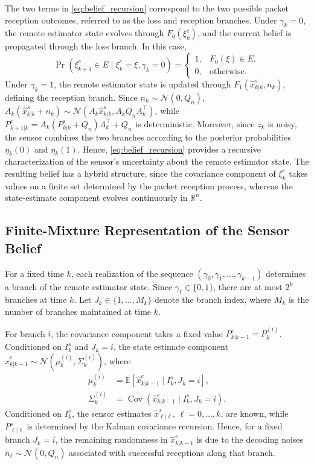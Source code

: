\documentclass[letterpaper, 10 pt, conference]{ieeeconf}
\begin{document}
The two terms in \eqref{eq:belief_recursion} correspond to the two possible packet reception outcomes, referred to as the loss and reception branches.  Under $\gamma_k=0$, the remote estimator state evolves through $F_0(\xi_k^e)$, and the current belief is propagated through the loss branch. In this case, 
\begin{equation*}
    \operatorname{Pr}(\xi^e_{k+1}\in E\mid \xi_k^e=\xi,\gamma_k=0) = \begin{cases}
        1, &  F_0(\xi)\in E,\\[3pt]
        0, & \text{otherwise}.
    \end{cases}
\end{equation*}
Under $\gamma_k=1$, the remote estimator state is updated through $F_1(\hat{x}^s_{k|k},n_k)$, defining the reception branch. 
Since $n_k\sim \mathcal{N}(0,Q_n)$,  $A_k(\hat{x}^s_{k|k}+n_k)\sim \mathcal{N}(A_k\hat{x}^s_{k|k}, A_kQ_nA_k^\top)$, while $P_{k+1|k}^e=A_k(P_{k|k}^s+Q_n)A_k^\top +Q_w$ is deterministic. 
Moreover, since $z_k$ is noisy, the sensor combines the two branches according to the posterior probabilities $\eta_k(0)$ and $\eta_k(1)$. Hence, \eqref{eq:belief_recursion} provides a recursive characterization of the sensor's uncertainty about the remote estimator state. The resulting belief has a hybrid structure, since the covariance component of $\xi_k^e$ takes values on a finite set determined by the packet reception process, whereas the state-estimate component evolves continuously in $\mathbb{R}^n$.




\subsection{Finite-Mixture Representation of the Sensor Belief}\label{subsec.finite.mixture}
For a fixed time $k$, each realization of the  sequence $(\gamma_0,\gamma_1,\dots,\gamma_{k-1})$ determines a branch of the remote estimator state. Since $\gamma_{\ell} \in \{0,1\}$, there are at most $2^k$ branches at time $k$. Let $J_k\in \{1,\dots,M_k\}$ denote the branch index, where $M_k$ is the number of branches maintained at time $k$. 

For branch $i$, the covariance component takes a fixed value $P^e_{k|k-1}=P_k^{(i)}$. Conditioned on $I_k^s$ and $J_k=i$, the state estimate component $\hat{x}^e_{k|k-1}\sim\mathcal{N}(\mu_k^{(i)},\Sigma_k^{(i)})$, where 
\begin{align*}
    \mu_k^{(i)}&=\mathbb{E}[\hat{x}^e_{k|k-1}\mid I_k^s, J_k=i],\\
    \Sigma_k^{(i)}&=\operatorname{Cov}(\hat{x}^e_{k|k-1}\mid I_k^s,J_k=i).
\end{align*}
Conditioned on $I_k^s$, the sensor estimates $\hat{x}^s_{\ell|\ell}$, $\ell=0,\dots,k$, are known, while $P^s_{\ell|\ell}$ is determined by the Kalman covariance recursion. Hence, for a fixed branch $J_k=i$, the remaining randomness in $\hat{x}^e_{k|k-1}$ is due to the decoding noises $n_\ell\sim \mathcal{N}(0,Q_n)$ associated with successful receptions along that branch.
\end{document}
